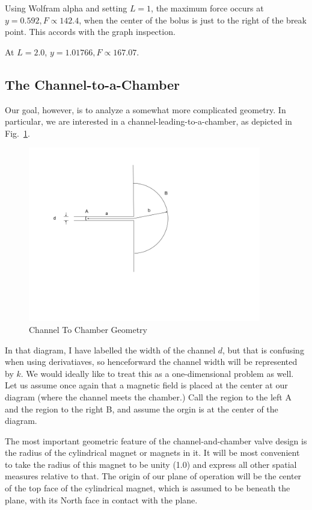 \documentclass[]{asme2ej}
\begin{document}
Using Wolfram alpha and setting $L = 1$, the maximum force occurs
at $y = 0.592, F \propto 142.4 $, when the center of the bolus is just to the right
of the break point. This accords with the graph inspection.

At $L = 2.0$, $y = 1.01766, F \propto 167.07$.


\subsection{The Channel-to-a-Chamber}

Our goal, however, is to analyze a somewhat more complicated geometry.
In particular, we are interested in a channel-leading-to-a-chamber,
as depicted in Fig.~\ref{fig:ChannelToChamber}.

\begin{figure}
\centerline{\includegraphics[width=4in]{figure/ChannelToChamber.png}}
\caption{Channel To Chamber Geometry}
\label{fig:ChannelToChamber}
\end{figure}

In that diagram, I have labelled the width of the channel $d$, but that is
confusing when using derivatiaves, so henceforward the channel width will be represented by $k$.
We would ideally like to treat this as a one-dimensional problem as well.
Let us assume once again that a magnetic field is placed at the center
at our diagram (where the channel meets the chamber.)
Call the region to the left A and the region to the right B, and assume
the orgin is at the center of the diagram.

The most important geometric feature of the channel-and-chamber
valve design is the radius of the cylindrical magnet or magnets
in it. It will be most convenient to take the radius of this
magnet to be unity (1.0) and express all other spatial
measures relative to that. The origin of our plane of operation
will be the center of the top face of the cylindrical magnet,
which is assumed to be beneath the plane, with its North face
in contact with the plane.
\end{document}
